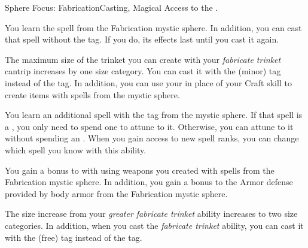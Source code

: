     \begin{feat}{Sphere Focus: Fabrication}{Casting, Magical}
        \featpre Access to the  .

         You learn the  spell from the Fabrication mystic sphere.
        In addition, you can cast that spell without the  tag.
        If you do, its effects last until you cast it again.

         The maximum size of the trinket you can create with your \textit{fabricate trinket} cantrip increases by one size category.
        You can cast it with the  (minor) tag instead of the  tag.
        In addition, you can use your  in place of your Craft skill to create items with spells from the  mystic sphere.

         You learn an additional spell with the  tag from the  mystic sphere.
        If that spell is a , you only need to spend one  to attune to it.
        Otherwise, you can attune to it without spending an .
        When you gain access to new spell ranks, you can change which spell you know with this ability.

         You gain a  bonus to  with  using weapons you created with spells from the Fabrication mystic sphere.
        In addition, you gain a  bonus to the Armor defense provided by body armor from the Fabrication mystic sphere.

         The size increase from your \textit{greater fabricate trinket} ability increases to two size categories.
        In addition, when you cast the \textit{fabricate trinket} ability, you can cast it with the  (free) tag instead of the  tag.
    \end{feat}

